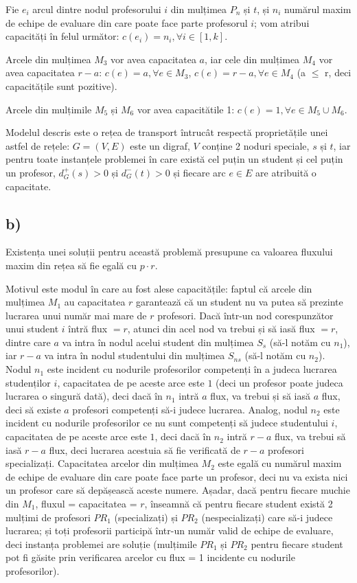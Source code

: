 \documentclass[a4paper,12pt]{article}
\begin{document}
\begin{itemize}
	Fie $e_i$ arcul dintre nodul profesorului $i$ din mulțimea $P_n$ și $t$, și $n_i$ numărul maxim de echipe de evaluare din care poate face parte profesorul $i$; vom atribui capacități în felul următor: $c(e_i) = n_i, \forall i \in [1, k]$.
	
	Arcele din mulțimea $M_3$ vor avea capacitatea $a$, iar cele din mulțimea $M_4$ vor avea capacitatea $r-a$: $c(e) = a, \forall e \in M_3$, $c(e) = r-a, \forall e \in M_4$ (a $\leq$ r, deci capacitățile sunt pozitive).
	
	Arcele din mulțimile $M_5$ și $M_6$ vor avea capacitătile 1: $c(e) = 1, \forall e \in M_5 \cup M_6$.
	
\end{itemize}

Modelul descris este o rețea de transport întrucât respectă proprietățile unei astfel de rețele: $G = (V, E)$ este un digraf, $V$ conține 2 noduri speciale, $s$ și $t$, iar pentru toate instanțele problemei în care există cel puțin un student și cel puțin un profesor, $d_G^+(s) > 0$ și $d_G^-(t) > 0$ și fiecare arc $e \in E$ are atribuită o capacitate. 

\subsection{b)}

Existența unei soluții pentru această problemă presupune ca valoarea fluxului maxim din rețea să fie egală cu $p \cdot r$.

Motivul este modul în care au fost alese capacitățile: faptul că arcele din mulțimea $M_1$ au capacitatea $r$ garantează că un student nu va putea să prezinte lucrarea unui număr mai mare de $r$ profesori. Dacă într-un nod corespunzător unui student $i$ întră flux $ = r$, atunci din acel nod va trebui și să iasă flux $ =r$, dintre care $a$ va intra în nodul acelui student din mulțimea $S_s$ (să-l notăm cu $n_1$), iar $r - a$ va intra în nodul studentului din mulțimea $S_{ns}$ (să-l notăm cu $n_2$). Nodul $n_1$ este incident cu nodurile profesorilor competenți în a judeca lucrarea studenților $i$, capacitatea de pe aceste arce este $1$ (deci un profesor poate judeca lucrarea o singură dată), deci dacă în $n_1$ intră $a$ flux, va trebui și să iasă $a$ flux, deci să existe $a$ profesori competenți să-i judece lucrarea. Analog, nodul $n_2$ este incident cu nodurile profesorilor ce nu sunt competenți să judece studentului $i$, capacitatea de pe aceste arce este $1$, deci dacă în $n_2$ intră $r-a$ flux, va trebui să iasă $r-a$ flux, deci lucrarea acestuia să fie verificată de $r-a$ profesori specializați. Capacitatea arcelor din mulțimea $M_2$ este egală cu numărul maxim de echipe de evaluare din care poate face parte un profesor, deci nu va exista nici un profesor care să depășească aceste numere. Așadar, dacă pentru fiecare muchie din $M_1$, fluxul = capacitatea = $r$, înseamnă că pentru fiecare student există 2 mulțimi de profesori $PR_1$ (specializați) și $PR_2$ (nespecializați) care să-i judece lucrarea; și toți profesorii participă într-un număr valid de echipe de evaluare, deci instanța problemei are soluție (mulțimile $PR_1$ și $PR_2$ pentru fiecare student pot fi găsite prin verificarea arcelor cu flux = 1 incidente cu nodurile profesorilor). 
\end{document}
